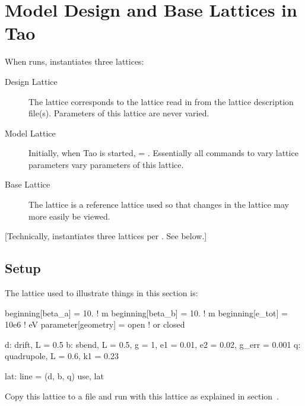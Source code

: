 \documentclass{hitec}
\newcommand{\Section}[1]{\section{#1}\vspace*{-1ex}}
\begin{document}
\newpage

\Section{Model Design and Base Lattices in Tao}

When \tao runs, \tao instantiates three lattices:
\begin{description}
\item[Design Lattice] \Newline
The  lattice corresponds to the lattice read in from the lattice
description file(s). Parameters of this lattice are never varied.
\item[Model Lattice] \Newline
Initially, when Tao is started,  = . Essentially all commands to vary lattice
parameters vary parameters of this lattice.
\item[Base Lattice] \Newline
The  lattice is a reference lattice used so that changes in the  
lattice may more easily be viewed.
\end{description}

[Technically, \tao instantiates three lattices per . See below.]

\subsection{Setup}

The lattice used to illustrate things in this section is:
{\small
\begin{code}
beginning[beta_a] = 10.   ! m
beginning[beta_b] = 10.   ! m
beginning[e_tot] = 10e6   ! eV
parameter[geometry] = open  ! or closed

d: drift, L = 0.5
b: sbend, L = 0.5, g = 1, e1 = 0.01, e2 = 0.02, g_err = 0.001
q: quadrupole, L = 0.6, k1 = 0.23

lat: line = (d, b, q)
use, lat
\end{code}}

Copy this lattice to a file and run \tao with this lattice as explained in section~.
\end{document}
